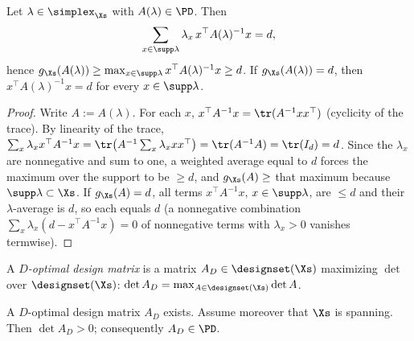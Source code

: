 \begin{lemma}\label{lem:g_ge_d}
\leanok
{}
Let $\lambda \in \simplex_{\Xs}$ with $A(\lambda) \in \PD$. Then
\[
  \sum_{x \in \supp\lambda} \lambda_x\, x^\top A(\lambda)^{-1} x = d ,
\]
hence $g_{\Xs}(A(\lambda)) \ge \max_{x\in\supp\lambda} x^\top A(\lambda)^{-1}x \ge d$. If
$g_{\Xs}(A(\lambda)) = d$, then $x^\top A(\lambda)^{-1} x = d$ for every $x \in \supp\lambda$.
\end{lemma}

\begin{proof}
\leanok
{}
Write $A := A(\lambda)$. For each $x$, $x^\top A^{-1} x = \tr(A^{-1} x x^\top)$ (cyclicity of the
trace). By linearity of the trace,
$\sum_x \lambda_x x^\top A^{-1} x = \tr\big(A^{-1}\sum_x \lambda_x xx^\top\big) = \tr(A^{-1}A) =
\tr(I_d) = d$. Since the $\lambda_x$ are nonnegative and sum to one, a weighted average equal to
$d$ forces the maximum over the support to be $\ge d$, and $g_{\Xs}(A) \ge$ that maximum because
$\supp\lambda \subset \Xs$. If $g_{\Xs}(A) = d$, all terms $x^\top A^{-1}x$, $x \in \supp\lambda$,
are $\le d$ and their $\lambda$-average is $d$, so each equals $d$ (a nonnegative combination
$\sum_x \lambda_x (d - x^\top A^{-1} x) = 0$ of nonnegative terms with $\lambda_x > 0$ vanishes
termwise).
\end{proof}

\begin{definition}\label{def:d_optimal}
A \emph{$D$-optimal design matrix} is a matrix $A_D \in \designset(\Xs)$ maximizing $\det$ over
$\designset(\Xs)$: $\det A_D = \max_{A \in \designset(\Xs)} \det A$.
\end{definition}

\begin{lemma}\label{lem:exists_d_optimal}
\leanok
{}
A $D$-optimal design matrix $A_D$ exists. Assume moreover that $\Xs$ is spanning. Then
$\det A_D > 0$; consequently $A_D \in \PD$.
\end{lemma}

